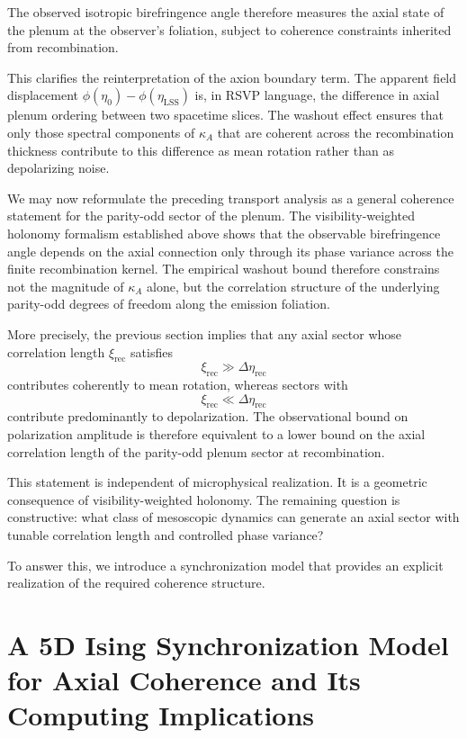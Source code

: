 \documentclass[12pt]{article}
\begin{document}
The observed isotropic birefringence angle therefore measures the axial state of the plenum at the observer's foliation, subject to coherence constraints inherited from recombination.

This clarifies the reinterpretation of the axion boundary term. The apparent field displacement $\phi(\eta_0) - \phi(\eta_{\mathrm{LSS}})$ is, in RSVP language, the difference in axial plenum ordering between two spacetime slices. The washout effect ensures that only those spectral components of $\kappa_A$ that are coherent across the recombination thickness contribute to this difference as mean rotation rather than as depolarizing noise.

We may now reformulate the preceding transport analysis as a general coherence statement for the parity-odd sector of the plenum. The visibility-weighted holonomy formalism established above shows that the observable birefringence angle depends on the axial connection only through its phase variance across the finite recombination kernel. The empirical washout bound therefore constrains not the magnitude of $\kappa_A$ alone, but the correlation structure of the underlying parity-odd degrees of freedom along the emission foliation.

More precisely, the previous section implies that any axial sector whose correlation length $\xi_{\mathrm{rec}}$ satisfies
\begin{equation}
\xi_{\mathrm{rec}} \gg \Delta\eta_{\mathrm{rec}}
\end{equation}
contributes coherently to mean rotation, whereas sectors with
\begin{equation}
\xi_{\mathrm{rec}} \ll \Delta\eta_{\mathrm{rec}}
\end{equation}
contribute predominantly to depolarization. The observational bound on polarization amplitude is therefore equivalent to a lower bound on the axial correlation length of the parity-odd plenum sector at recombination.

This statement is independent of microphysical realization. It is a geometric consequence of visibility-weighted holonomy. The remaining question is constructive: what class of mesoscopic dynamics can generate an axial sector with tunable correlation length and controlled phase variance?

To answer this, we introduce a synchronization model that provides an explicit realization of the required coherence structure.

\newpage
\section{A 5D Ising Synchronization Model for Axial Coherence and Its Computing Implications}
\end{document}
